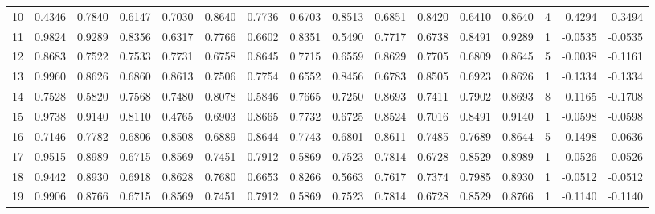 \begin{tabular}{lrrrrrrrrrrrrrrr}
10 &      0.4346 &  0.7840 &  0.6147 &  0.7030 &  0.8640 &  0.7736 &  0.6703 &  0.8513 &  0.6851 &  0.8420 &   0.6410 &     0.8640 &      4 &                    0.4294 &                     0.3494 \\
11 &      0.9824 &  0.9289 &  0.8356 &  0.6317 &  0.7766 &  0.6602 &  0.8351 &  0.5490 &  0.7717 &  0.6738 &   0.8491 &     0.9289 &      1 &                   -0.0535 &                    -0.0535 \\
12 &      0.8683 &  0.7522 &  0.7533 &  0.7731 &  0.6758 &  0.8645 &  0.7715 &  0.6559 &  0.8629 &  0.7705 &   0.6809 &     0.8645 &      5 &                   -0.0038 &                    -0.1161 \\
13 &      0.9960 &  0.8626 &  0.6860 &  0.8613 &  0.7506 &  0.7754 &  0.6552 &  0.8456 &  0.6783 &  0.8505 &   0.6923 &     0.8626 &      1 &                   -0.1334 &                    -0.1334 \\
14 &      0.7528 &  0.5820 &  0.7568 &  0.7480 &  0.8078 &  0.5846 &  0.7665 &  0.7250 &  0.8693 &  0.7411 &   0.7902 &     0.8693 &      8 &                    0.1165 &                    -0.1708 \\
15 &      0.9738 &  0.9140 &  0.8110 &  0.4765 &  0.6903 &  0.8665 &  0.7732 &  0.6725 &  0.8524 &  0.7016 &   0.8491 &     0.9140 &      1 &                   -0.0598 &                    -0.0598 \\
16 &      0.7146 &  0.7782 &  0.6806 &  0.8508 &  0.6889 &  0.8644 &  0.7743 &  0.6801 &  0.8611 &  0.7485 &   0.7689 &     0.8644 &      5 &                    0.1498 &                     0.0636 \\
17 &      0.9515 &  0.8989 &  0.6715 &  0.8569 &  0.7451 &  0.7912 &  0.5869 &  0.7523 &  0.7814 &  0.6728 &   0.8529 &     0.8989 &      1 &                   -0.0526 &                    -0.0526 \\
18 &      0.9442 &  0.8930 &  0.6918 &  0.8628 &  0.7680 &  0.6653 &  0.8266 &  0.5663 &  0.7617 &  0.7374 &   0.7985 &     0.8930 &      1 &                   -0.0512 &                    -0.0512 \\
19 &      0.9906 &  0.8766 &  0.6715 &  0.8569 &  0.7451 &  0.7912 &  0.5869 &  0.7523 &  0.7814 &  0.6728 &   0.8529 &     0.8766 &      1 &                   -0.1140 &                    -0.1140 \\
\bottomrule
\end{tabular}

